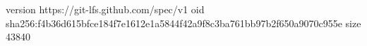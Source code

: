 version https://git-lfs.github.com/spec/v1
oid sha256:f4b36d615bfce184f7e1612e1a5844f42a9f8c3ba761bb97b2f650a9070c955e
size 43840
